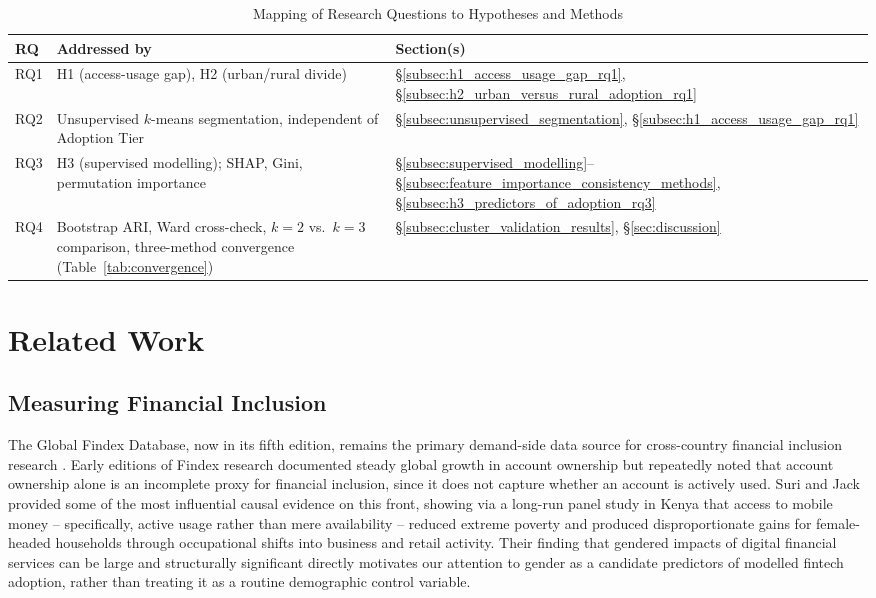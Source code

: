 \documentclass[conference]{IEEEtran}
\begin{document}
\begin{table}[h]
\caption{Mapping of Research Questions to Hypotheses and Methods}
\label{tab:rq_map}
\centering
\renewcommand{\arraystretch}{1.3}
\begin{tabular}{p{0.7cm}p{3.4cm}p{3.4cm}}
\toprule
\textbf{RQ} & \textbf{Addressed by} & \textbf{Section(s)} \\
\midrule
RQ1 & H1 (access-usage gap), H2 (urban/rural divide) & \S\ref{subsec:h1_access_usage_gap_rq1}, \S\ref{subsec:h2_urban_versus_rural_adoption_rq1} \\
\addlinespace
RQ2 & Unsupervised $k$-means segmentation, independent of Adoption Tier &
\S\ref{subsec:unsupervised_segmentation}, \S\ref{subsec:h1_access_usage_gap_rq1} \\
\addlinespace
RQ3 & H3 (supervised modelling); SHAP, Gini, permutation importance &
\S\ref{subsec:supervised_modelling}--\S\ref{subsec:feature_importance_consistency_methods}, \S\ref{subsec:h3_predictors_of_adoption_rq3} \\
\addlinespace
RQ4 & Bootstrap ARI, Ward cross-check, $k=2$ vs.\ $k=3$ comparison,
three-method convergence (Table~\ref{tab:convergence}) & \S\ref{subsec:cluster_validation_results}, \S\ref{sec:discussion} \\
\bottomrule
\end{tabular}
\end{table}

\section{Related Work}
\label{sec:related_work}
 
\subsection{Measuring Financial Inclusion}
\label{subsec:measuring_financial_inclusion}
The Global Findex Database, now in its fifth edition, remains the primary demand-side data source for cross-country financial inclusion research \cite{demirguckunt2022}. Early editions of Findex research documented steady global growth in account ownership but repeatedly noted that account ownership alone is an incomplete proxy for financial inclusion, since it does not capture whether an account is actively used. Suri and Jack \cite{surijack2016} provided some of the most influential causal evidence on this front, showing via a long-run panel study in Kenya that access to mobile money -- specifically, active usage rather than mere availability -- reduced extreme poverty and produced disproportionate gains for female-headed households through occupational shifts into business and retail activity. Their finding that gendered impacts of digital financial services can be large and structurally significant directly motivates our attention to gender as a candidate predictors of modelled fintech adoption, rather than treating it as a routine demographic control variable.
 
\end{document}
